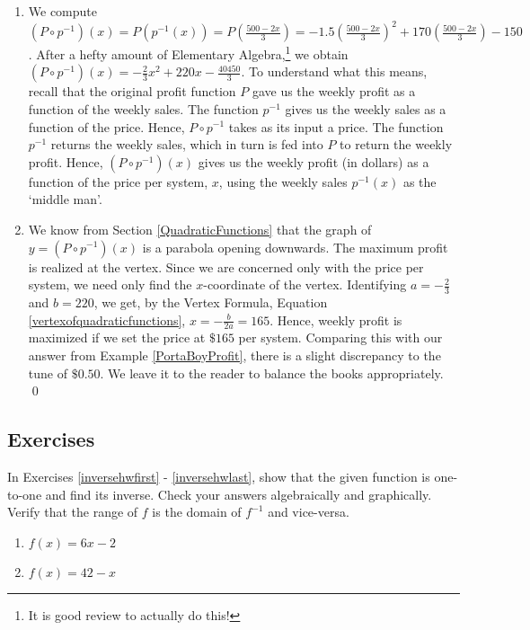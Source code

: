 \begin{ex}
\begin{enumerate}
\item  We compute $\left( P \circ p^{-1}\right)(x) = P \left(p^{-1}(x)\right) = P\left(\frac{500-2x}{3}\right) =  -1.5\left(\frac{500-2x}{3}\right)^2+170\left(\frac{500-2x}{3}\right)-150$. After a hefty amount of Elementary Algebra,\footnote{It is good review to actually do this!} we obtain $\left( P \circ p^{-1}\right)(x) = -\frac{2}{3} x^2 +220x - \frac{40450}{3}$.  To understand what this means, recall that the original profit function $P$ gave us the weekly profit as a function of the weekly sales.  The function $p^{-1}$ gives us the weekly sales as a function of the price.  Hence, $P \circ p^{-1}$ takes as its input a price.   The function $p^{-1}$ returns the weekly sales, which in turn is fed into $P$ to return the weekly profit.  Hence, $\left(P \circ p^{-1}\right)(x)$ gives us the weekly profit (in dollars) as a function of the price per system, $x$, using the weekly sales $p^{-1}(x)$ as the `middle man'. 

\item  We know from Section \ref{QuadraticFunctions} that the graph of $y = \left( P \circ p^{-1}\right)(x)$ is a parabola opening downwards.  The maximum profit is realized at the vertex. Since we are concerned only with the price per system, we need only find the $x$-coordinate of the vertex.  Identifying $a = -\frac{2}{3}$ and $b = 220$, we get, by the Vertex Formula, Equation \ref{vertexofquadraticfunctions},  $x = -\frac{b}{2a} = 165$.  Hence, weekly profit is maximized if we set the price at $\$165$ per system.  Comparing this with our answer from Example \ref{PortaBoyProfit}, there is a slight discrepancy to the tune of $\$0.50$.  We leave it to the reader to balance the books appropriately.  \qed 

\end{enumerate}

\end{ex}

\newpage

\subsection{Exercises}

In Exercises \ref{inversehwfirst} - \ref{inversehwlast}, show that the given function is one-to-one and find its inverse.  Check your answers algebraically and graphically.  Verify that the range of $f$ is the domain of $f^{-1}$ and vice-versa.

\begin{multicols}{2}
\begin{enumerate}

\item $f(x) = 6x - 2$ \label{inversehwfirst}
\item $f(x) = 42-x$


\setcounter{HW}{\value{enumi}}
\end{enumerate}
\end{multicols}


